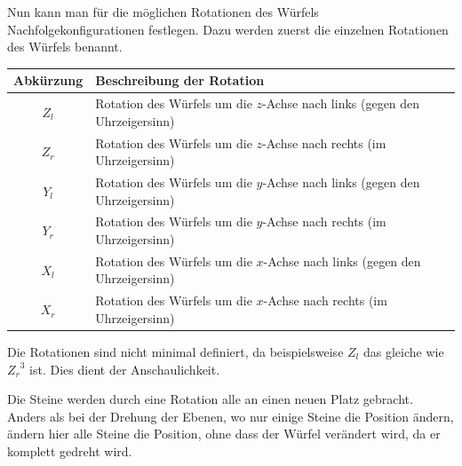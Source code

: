 \documentclass[12pt,a4paper, usenames, dvipsnames]{article}
\theoremstyle{mystyle}
\theoremstyle{definition}
\begin{document}
Nun kann man für die möglichen Rotationen des Würfels Nachfolgekonfigurationen festlegen. 
Dazu werden zuerst die einzelnen Rotationen des Würfels benannt. 

\begin{tabular}{cl}
\toprule
\textbf{Abkürzung} & \textbf{Beschreibung der Rotation} \\
\midrule
$Z_l$ & Rotation des Würfels um die $z$-Achse nach links (gegen den Uhrzeigersinn)\\

$Z_r$ & Rotation des Würfels um die $z$-Achse nach rechts (im Uhrzeigersinn)  \\

$Y_l$ & Rotation des Würfels um die $y$-Achse nach links (gegen den Uhrzeigersinn)\\

$Y_r$ & Rotation des Würfels um die $y$-Achse nach rechts (im Uhrzeigersinn)  \\

$X_l$ & Rotation des Würfels um die $x$-Achse nach links (gegen den Uhrzeigersinn)\\

$X_r$ & Rotation des Würfels um die $x$-Achse nach rechts (im Uhrzeigersinn) \\
\bottomrule
\end{tabular} 


Die Rotationen sind nicht minimal definiert, da beispielsweise $Z_l$ das gleiche wie ${Z_r}^3$ ist. Dies dient der Anschaulichkeit. 

Die Steine werden durch eine Rotation alle an einen neuen Platz gebracht. Anders als bei der Drehung der Ebenen, wo nur einige Steine die Position ändern, ändern hier alle Steine die Position, ohne dass der Würfel verändert wird, da er komplett gedreht wird. 
\end{document}
